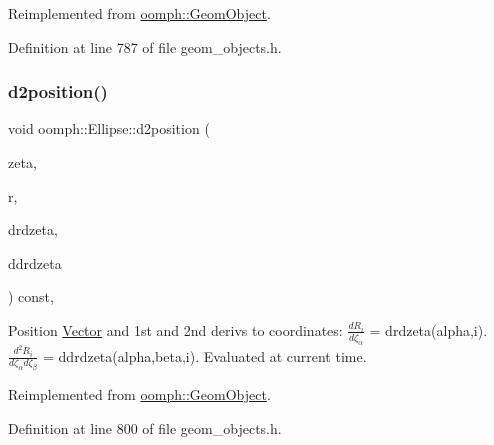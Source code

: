 Reimplemented from \hyperlink{classoomph_1_1GeomObject_a08472dbe196123490ea109762cefd00c}{oomph\+::\+Geom\+Object}.



Definition at line 787 of file geom\+\_\+objects.\+h.

\mbox{\label{classoomph_1_1Ellipse_a5cf7ea86ce09f7371e03fea52395cf3b}} 
\subsubsection{\texorpdfstring{d2position()}{d2position()}\hspace{0.1cm}{\footnotesize\ttfamily [2/2]}}
{\footnotesize\ttfamily void oomph\+::\+Ellipse\+::d2position (\begin{DoxyParamCaption}\item[{const \hyperlink{classoomph_1_1Vector}{Vector}$<$ double $>$ \&}]{zeta,  }\item[{\hyperlink{classoomph_1_1Vector}{Vector}$<$ double $>$ \&}]{r,  }\item[{\hyperlink{classoomph_1_1DenseMatrix}{Dense\+Matrix}$<$ double $>$ \&}]{drdzeta,  }\item[{\hyperlink{classoomph_1_1RankThreeTensor}{Rank\+Three\+Tensor}$<$ double $>$ \&}]{ddrdzeta }\end{DoxyParamCaption}) const\hspace{0.3cm}{\ttfamily [inline]}, {\ttfamily [virtual]}}



Position \hyperlink{classoomph_1_1Vector}{Vector} and 1st and 2nd derivs to coordinates\+: $ \frac{dR_i}{d \zeta_\alpha}$ = drdzeta(alpha,i). $ \frac{d^2R_i}{d \zeta_\alpha d \zeta_\beta}$ = ddrdzeta(alpha,beta,i). Evaluated at current time. 



Reimplemented from \hyperlink{classoomph_1_1GeomObject_a4fdbd372e26d4486026c06dcfdaafe81}{oomph\+::\+Geom\+Object}.



Definition at line 800 of file geom\+\_\+objects.\+h.

\mbox{\label{classoomph_1_1Ellipse_af8caf51de734dff257fa3dbde14fa167}} 

